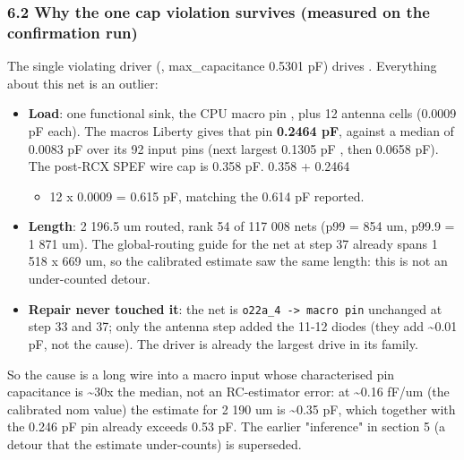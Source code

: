\subsubsection{6.2 Why the one cap violation survives (measured on the
confirmation run)}\label{cr:defect:sky130-slew-cap-e45j:62-why-the-one-cap-violation-survives-measured-on-the-confirmation-run}

\begin{record}

The single violating driver 
(, max\_\allowbreak{}capacitance 0.5301
pF) drives . Everything about this net is
an outlier:

\begin{itemize}
\tightlist
\item
  \textbf{Load}: one functional sink, the CPU macro pin
  , plus 12  antenna cells (0.0009
  pF each). The macro\textquotesingle s Liberty gives that pin
  \textbf{0.2464 pF}, against a median of 0.0083 pF over its 92 input
  pins (next largest 0.1305 pF , then 0.0658 pF).
  The post-RCX SPEF wire cap is 0.358 pF. 0.358 + 0.2464

  \begin{itemize}
  \tightlist
  \item
    12 x 0.0009 = 0.615 pF, matching the 0.614 pF reported.
  \end{itemize}
\item
  \textbf{Length}: 2 196.5 um routed, rank 54 of 117 008 nets (p99 = 854
  um, p99.9 = 1 871 um). The global-routing guide for the net at step 37
  already spans 1 518 x 669 um, so the calibrated estimate saw the same
  length: this is not an under-counted detour.
\item
  \textbf{Repair never touched it}: the net is
  \texttt{o22a\_\allowbreak{}4\ -\allowbreak{}>\ macro\ pin} unchanged
  at step 33 and 37; only the antenna step added the 11-12 diodes (they
  add \textasciitilde0.01 pF, not the cause). The driver is already the
  largest drive in its family.
\end{itemize}

So the cause is a long wire into a macro input whose characterised pin
capacitance is \textasciitilde30x the median, not an RC-estimator error:
at \textasciitilde0.16 fF/um (the calibrated nom value) the estimate for
2 190 um is \textasciitilde0.35 pF, which together with the 0.246 pF pin
already exceeds 0.53 pF. The earlier "inference" in section 5 (a detour
that the estimate under-counts) is superseded.

\end{record}

